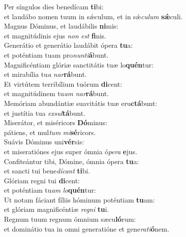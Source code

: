 \evenverse Per síngulos dies benedícam \textbf{ti}bi:~\*\\
\evenverse et laudábo nomen tuum in sǽculum, et in sǽ\textit{cu}\textit{lum} \textbf{sǽ}culi.\\
\oddverse Magnus Dóminus, et laudábilis \textbf{ni}mis:~\*\\
\oddverse et magnitúdinis ejus \textit{non} \textit{est} \textbf{fi}nis.\\
\evenverse Generátio et generátio laudábit ópera \textbf{tu}a:~\*\\
\evenverse et poténtiam tuam pro\textit{nun}\textit{ti}\textbf{á}bunt.\\
\oddverse Magnificéntiam glóriæ sanctitátis tuæ lo\textbf{quén}tur:~\*\\
\oddverse et mirabília tu\textit{a} \textit{nar}\textbf{rá}bunt.\\
\evenverse Et virtútem terribílium tuórum \textbf{di}cent:~\*\\
\evenverse et magnitúdinem tu\textit{am} \textit{nar}\textbf{rá}bunt.\\
\oddverse Memóriam abundántiæ suavitátis tuæ eru\textbf{ctá}bunt:~\*\\
\oddverse et justítia tua \textit{ex}\textit{sul}\textbf{tá}bunt.\\
\evenverse Miserátor, et miséricors \textbf{Dó}minus:~\*\\
\evenverse pátiens, et mul\textit{tum} \textit{mi}\textbf{sé}ricors.\\
\oddverse Suávis Dóminus uni\textbf{vér}sis:~\*\\
\oddverse et miseratiónes ejus super ómnia ó\textit{pe}\textit{ra} \textbf{e}jus.\\
\evenverse Confiteántur tibi, Dómine, ómnia ópera \textbf{tu}a:~\*\\
\evenverse et sancti tui bene\textit{dí}\textit{cant} \textbf{ti}bi.\\
\oddverse Glóriam regni tui \textbf{di}cent:~\*\\
\oddverse et poténtiam tu\textit{am} \textit{lo}\textbf{quén}tur:\\
\evenverse Ut notam fáciant fíliis hóminum poténtiam \textbf{tu}am:~\*\\
\evenverse et glóriam magnificéntiæ \textit{re}\textit{gni} \textbf{tu}i.\\
\oddverse Regnum tuum regnum ómnium sæcu\textbf{ló}rum:~\*\\
\oddverse et dominátio tua in omni generatióne et gene\textit{ra}\textit{ti}\textbf{ó}nem.\\
